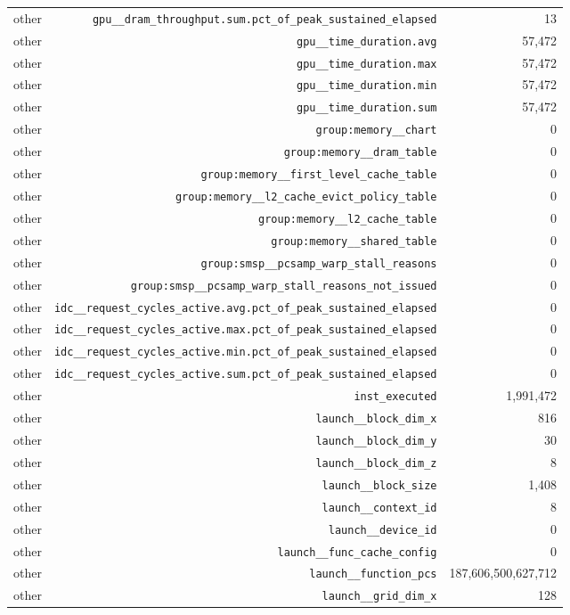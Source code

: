 \begin{table}[h]
\begin{tabular}{|l|r|r|}
other & \texttt{gpu__dram_throughput.sum.pct_of_peak_sustained_elapsed} & 13 \\
other & \texttt{gpu__time_duration.avg} & 57,472 \\
other & \texttt{gpu__time_duration.max} & 57,472 \\
other & \texttt{gpu__time_duration.min} & 57,472 \\
other & \texttt{gpu__time_duration.sum} & 57,472 \\
other & \texttt{group:memory__chart} & 0 \\
other & \texttt{group:memory__dram_table} & 0 \\
other & \texttt{group:memory__first_level_cache_table} & 0 \\
other & \texttt{group:memory__l2_cache_evict_policy_table} & 0 \\
other & \texttt{group:memory__l2_cache_table} & 0 \\
other & \texttt{group:memory__shared_table} & 0 \\
other & \texttt{group:smsp__pcsamp_warp_stall_reasons} & 0 \\
other & \texttt{group:smsp__pcsamp_warp_stall_reasons_not_issued} & 0 \\
other & \texttt{idc__request_cycles_active.avg.pct_of_peak_sustained_elapsed} & 0 \\
other & \texttt{idc__request_cycles_active.max.pct_of_peak_sustained_elapsed} & 0 \\
other & \texttt{idc__request_cycles_active.min.pct_of_peak_sustained_elapsed} & 0 \\
other & \texttt{idc__request_cycles_active.sum.pct_of_peak_sustained_elapsed} & 0 \\
other & \texttt{inst_executed} & 1,991,472 \\
other & \texttt{launch__block_dim_x} & 816 \\
other & \texttt{launch__block_dim_y} & 30 \\
other & \texttt{launch__block_dim_z} & 8 \\
other & \texttt{launch__block_size} & 1,408 \\
other & \texttt{launch__context_id} & 8 \\
other & \texttt{launch__device_id} & 0 \\
other & \texttt{launch__func_cache_config} & 0 \\
other & \texttt{launch__function_pcs} & 187,606,500,627,712 \\
other & \texttt{launch__grid_dim_x} & 128 \\

\end{tabular}
\end{table}
